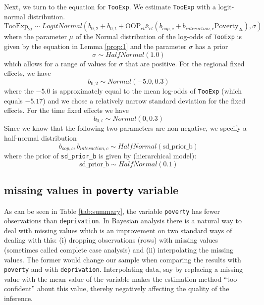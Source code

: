 \documentclass[a4paper,12pt]{article}
\begin{document}
Next, we turn to the equation for \texttt{TooExp}. We estimate \texttt{TooExp} with a logit-normal distribution.
\begin{equation}
\label{eq:TooExpDist}
\text{TooExp}_{2t} \sim LogitNormal(b_{0,2} + b_{0,t} + \text{OOP}_{ct} \bar{x}_{ct} \left(  b_{oop,c} + b_{interaction,c} \text{Poverty}_{2t} \right),\sigma)
\end{equation}
where the parameter \(\mu\) of the Normal distribution of the log-odds of \texttt{TooExp} is given by the equation in Lemma \ref{prop:1} and the parameter \(\sigma\) has a prior
\begin{equation}
\sigma \sim HalfNormal(1.0)
\end{equation}
which allows for a range of values for \(\sigma\) that are positive.
For the regional fixed effects, we have
\begin{equation}
b_{0,2} \sim Normal(-5.0,0.3)
\end{equation}
where the \(-5.0\) is approximately equal to the mean log-odds of \texttt{TooExp} (which equals \(-5.17\)) and we chose a relatively narrow standard deviation for the fixed effects. For the time fixed effects we have
\begin{equation}
b_{0,t} \sim Normal(0,0.3)
\end{equation}
Since we know that the following two parameters are non-negative, we specify a half-normal distribution
\begin{equation}
b_{oop,c},b_{interaction,c} \sim HalfNormal(\text{sd\_prior\_b})
\end{equation}
where the prior of \texttt{sd\_prior\_b} is given by (hierarchical model):
\begin{equation}
\text{sd\_prior\_b} \sim HalfNormal(0.1)
\end{equation}

\subsection{missing values in \texttt{poverty} variable}
\label{sec:missingvalues}
As can be seen in Table \ref{tab:summary}, the variable \texttt{poverty} has fewer observations than \texttt{deprivation}. In Bayesian analysis there is a natural way to deal with missing values which is an improvement on two standard ways of dealing with this: (i) dropping observations (rows) with missing values (sometimes called complete case analysis) and (ii) interpolating the missing values. The former would change our sample when comparing the results with \texttt{poverty} and with \texttt{deprivation}. Interpolating data, say by replacing a missing value with the mean value of the variable makes the estimation method ``too confident'' about this value, thereby negatively affecting the quality of the inference.
\end{document}
